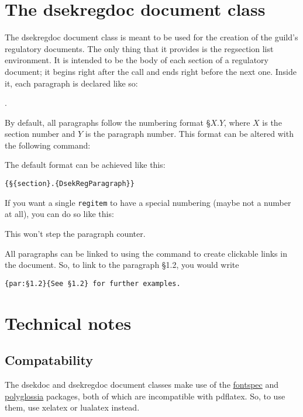 \documentclass[a4paper, oneside]{ltxdoc}
\begin{document}
\section{The \textsf{dsekregdoc} document class}
The \textsf{dsekregdoc} document class is meant to be used for the creation of
the guild's regulatory documents.  The only thing that it provides is the
\textsf{regsection} list environment.  It is intended to be the body of each
section of a regulatory document; it begins right after the  call
and ends right before the next one.  Inside it, each paragraph is declared like
so:

\begin{center}
  .
\end{center}

By default, all paragraphs follow the numbering format §\(X.Y\), where \(X\) is
the section number and \(Y\) is the paragraph number.  This format can be
altered with the following command:

\begin{center}
\end{center}

The default format can be achieved like this:

\begin{center}
  \texttt{\{§\{section\}.\{DsekRegParagraph\}\}}
\end{center}

If you want a single \texttt{regitem} to have a special numbering (maybe not a
number at all), you can do so like this:

\begin{center}
\end{center}

This won't step the paragraph counter.

All paragraphs can be linked to using the  command to create
clickable links in the document.  So, to link to the paragraph §1.2, you would
write

\begin{center}
  \texttt{\{par:§1.2\}\{See §1.2\} for further examples.}
\end{center}

\section{Technical notes}

\subsection{Compatability}

The \textsf{dsekdoc} and \textsf{dsekregdoc} document classes make use of the
\href{https://ctan.org/pkg/fontspec}{\textsf{fontspec}} and
\href{https://ctan.org/pkg/polyglossia}{\textsf{polyglossia}} packages, both of
which are incompatible with \textsf{pdflatex}.  So, to use them, use
\textsf{xelatex} or \textsf{lualatex} instead.
\end{document}
